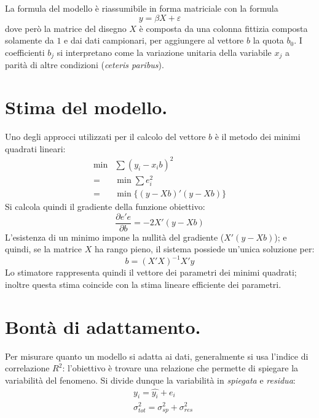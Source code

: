 \documentclass[11pt]{article}
\begin{document}
La formula del modello è riassumibile in forma matriciale con la formula
\begin{equation*}
  y = \beta X + \varepsilon
\end{equation*}
dove però la matrice del disegno $X$ è composta da una colonna fittizia composta solamente da $1$ e dai dati campionari, per aggiungere al vettore $b$ la quota $b_0$.
I coefficienti $b_j$ si interpretano come la variazione unitaria della variabile $x_j$ a parità di altre condizioni (\textit{ceteris paribus}).

\section{Stima del modello.}
Uno degli approcci utilizzati per il calcolo del vettore $b$ è il metodo dei minimi quadrati lineari:
\begin{align*}
  \min & \sum{(y_i - x_i b)^2} \\
  =& \min \sum{e_i^2} \\
  =& \min \{ (y -X b)'(y - X b) \}
\end{align*}
Si calcola quindi il gradiente della funzione obiettivo:
\begin{equation*}
  \frac{\partial{e'e}}{\partial{b}} = -2 X'(y - X b)
\end{equation*}
L'esistenza di un minimo impone la nullità del gradiente ($X'(y - X b)$); e quindi, se la matrice $X$ ha rango pieno, il sistema possiede un'unica soluzione per:
\begin{equation*}
  b = (X'X)^{-1}X'y
\end{equation*}
Lo stimatore rappresenta quindi il vettore dei parametri dei minimi quadrati; inoltre questa stima coincide con la stima lineare efficiente dei parametri.



\section{Bontà di adattamento.}
Per misurare quanto un modello si adatta ai dati, generalmente si usa l'indice di correlazione $R^2$: l'obiettivo è trovare una relazione che permette di spiegare la variabilità del fenomeno.
Si divide dunque la variabilità in \textit{spiegata} e \textit{residua}:
\begin{align*}
  &y_i = \hat{y_i} + e_i \\
  &\sigma^2_{tot} = \sigma^2_{sp} + \sigma^2_{res}
\end{align*}
\end{document}
